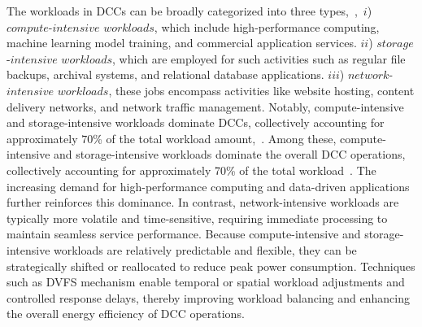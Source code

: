 \documentclass[lettersize,journal]{IEEEtran}
\begin{document}
The workloads in DCCs can be broadly categorized into three types,~\cite{6041050},~$i$) $compute$-$intensive$ $workloads$, which include high-performance computing, machine learning model training, and commercial application services. $ii$) $storage$-$intensive$ $workloads$, which are employed for such activities such as regular file backups, archival systems, and relational database applications. $iii$) $network$-$intensive$ $workloads$, these jobs encompass activities like website hosting, content delivery networks, and network traffic management.
Notably, compute-intensive and storage-intensive workloads dominate DCCs, collectively accounting for approximately $70$\% of the total workload amount,~\cite{wangClusterFrameworksEfficient2018}.
Among these, compute-intensive and storage-intensive workloads dominate the overall DCC operations, collectively accounting for approximately 70\% of the total workload~\cite{wangClusterFrameworksEfficient2018}. The increasing demand for high-performance computing and data-driven applications further reinforces this dominance. In contrast, network-intensive workloads are typically more volatile and time-sensitive, requiring immediate processing to maintain seamless service performance.
Because compute-intensive and storage-intensive workloads are relatively predictable and flexible, they can be strategically shifted or reallocated to reduce peak power consumption. Techniques such as
DVFS mechanism enable temporal or spatial workload adjustments and controlled response delays, thereby improving workload balancing and enhancing the overall energy
efficiency of DCC operations.
\end{document}
